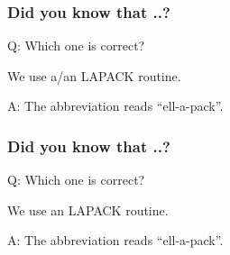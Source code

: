 \documentclass{beamer}
\begin{document}
\begin{frame}
\frametitle{Did you know that ..?}
Q: Which one is correct?
\\
\begin{center}
 We use {\color{red}a/an} LAPACK routine.
\end{center}
{\color{white}A: The abbreviation reads ``ell-a-pack''.}
\end{frame}

\begin{frame}[noframenumbering]
\frametitle{Did you know that ..?}
Q: Which one is correct?
\\
\begin{center}
 We use {\color{red}an} LAPACK routine.
\end{center}
A: The abbreviation reads ``ell-a-pack''.
\end{frame}

\begin{frame}
 \tableofcontents
\end{frame}
\end{document}
